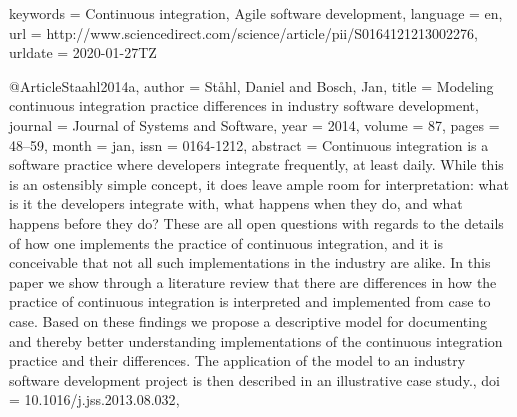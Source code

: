 {{{{{{{{  keywords = {Continuous integration, Agile software development},
  language = {en},
  url      = {http://www.sciencedirect.com/science/article/pii/S0164121213002276},
  urldate  = {2020-01-27TZ}
}

@Article{Staahl2014a,
  author   = {Ståhl, Daniel and Bosch, Jan},
  title    = {Modeling continuous integration practice differences in industry software development},
  journal  = {Journal of Systems and Software},
  year     = {2014},
  volume   = {87},
  pages    = {48--59},
  month    = jan,
  issn     = {0164-1212},
  abstract = {Continuous integration is a software practice where developers integrate frequently, at least daily. While this is an ostensibly simple concept, it does leave ample room for interpretation: what is it the developers integrate with, what happens when they do, and what happens before they do? These are all open questions with regards to the details of how one implements the practice of continuous integration, and it is conceivable that not all such implementations in the industry are alike. In this paper we show through a literature review that there are differences in how the practice of continuous integration is interpreted and implemented from case to case. Based on these findings we propose a descriptive model for documenting and thereby better understanding implementations of the continuous integration practice and their differences. The application of the model to an industry software development project is then described in an illustrative case study.},
  doi      = {10.1016/j.jss.2013.08.032},
}}}}}}}}
